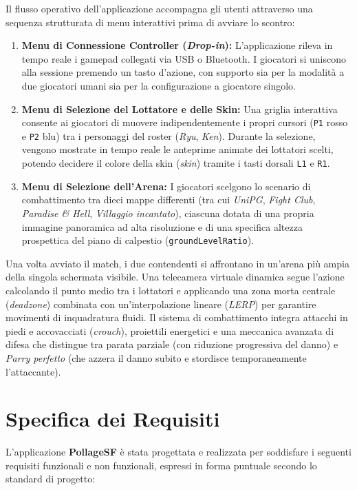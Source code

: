 \documentclass[11pt, a4paper]{article}
\begin{document}
Il flusso operativo dell'applicazione accompagna gli utenti attraverso una sequenza strutturata di menu interattivi prima di avviare lo scontro:
\begin{enumerate}
    \item \textbf{Menu di Connessione Controller (\emph{Drop-in}):} L'applicazione rileva in tempo reale i gamepad collegati via USB o Bluetooth. I giocatori si uniscono alla sessione premendo un tasto d'azione, con supporto sia per la modalità a due giocatori umani sia per la configurazione a giocatore singolo.
    \item \textbf{Menu di Selezione del Lottatore e delle Skin:} Una griglia interattiva consente ai giocatori di muovere indipendentemente i propri cursori (\texttt{P1} rosso e \texttt{P2} blu) tra i personaggi del roster (\emph{Ryu}, \emph{Ken}). Durante la selezione, vengono mostrate in tempo reale le anteprime animate dei lottatori scelti, potendo decidere il colore della skin (\emph{skin}) tramite i tasti dorsali \texttt{L1} e \texttt{R1}.
    \item \textbf{Menu di Selezione dell'Arena:} I giocatori scelgono lo scenario di combattimento tra dieci mappe differenti (tra cui \emph{UniPG}, \emph{Fight Club}, \emph{Paradise \& Hell}, \emph{Villaggio incantato}), ciascuna dotata di una propria immagine panoramica ad alta risoluzione e di una specifica altezza prospettica del piano di calpestio (\texttt{groundLevelRatio}).
\end{enumerate}

Una volta avviato il match, i due contendenti si affrontano in un'arena più ampia della singola schermata visibile. Una telecamera virtuale dinamica segue l'azione calcolando il punto medio tra i lottatori e applicando una zona morta centrale (\emph{deadzone}) combinata con un'interpolazione lineare (\emph{LERP}) per garantire movimenti di inquadratura fluidi. Il sistema di combattimento integra attacchi in piedi e accovacciati (\emph{crouch}), proiettili energetici e una meccanica avanzata di difesa che distingue tra parata parziale (con riduzione progressiva del danno) e \emph{Parry perfetto} (che azzera il danno subito e stordisce temporaneamente l'attaccante).

\newpage

\section{Specifica dei Requisiti}
L'applicazione \textbf{PollageSF} è stata progettata e realizzata per soddisfare i seguenti requisiti funzionali e non funzionali, espressi in forma puntuale secondo lo standard di progetto:
\end{document}
